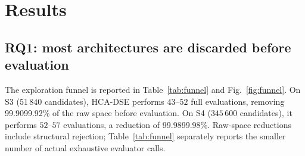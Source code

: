 \documentclass[preprint,11pt,3p]{elsarticle}
\theoremstyle{plain}
\theoremstyle{definition}
\newcommand{\SthreeEvalRange}{43\text{--}52}
\newcommand{\SfourEvalRange}{52\text{--}57}
\begin{document}
\section{Results}
\label{sec:results}

\FloatBarrier

\subsection{RQ1: most architectures are discarded before evaluation}
\providecommand{\RefFunnelSite}{Table~\ref{tab:funnel} and Fig.~\ref{fig:funnel}}
\providecommand{\RefFunnelTab}{Table~\ref{tab:funnel}}
\providecommand{\RefBaselinesTab}{Table~\ref{tab:baselines}}
\providecommand{\RefStatsTab}{Table~\ref{tab:stats}}
\providecommand{\RefHvFig}{Figure~\ref{fig:hv_budget}}
\providecommand{\RefCrossoverFig}{Fig.~\ref{fig:crossover}}
\providecommand{\RefAblationSite}{Table~\ref{tab:ablation} and Fig.~\ref{fig:ablation}}
\providecommand{\RefScalSite}{Table~\ref{tab:scalability} and Fig.~\ref{fig:scalability}}
\providecommand{\RefOrderTab}{Table~\ref{tab:order}}
\providecommand{\RefSolverTab}{Table~\ref{tab:solver}}
\providecommand{\RefDesTab}{Table~\ref{tab:des}}
\providecommand{\RefTestbedTab}{Table~\ref{tab:testbed}}
\providecommand{\RefReliabilityFig}{Fig.~\ref{fig:model_vs_measured}b}%
The exploration funnel is reported in \RefFunnelSite{}. On S3 ($51\,840$ candidates), HCA-DSE performs $\SthreeEvalRange$ full evaluations, removing 99.90\text{--}99.92\% of the raw space before evaluation. On S4 ($345\,600$ candidates), it performs $\SfourEvalRange$ evaluations, a reduction of 99.98\text{--}99.98\%. Raw-space reductions include structural rejection; \RefFunnelTab{} separately reports the smaller number of actual exhaustive evaluator calls.
\end{document}
